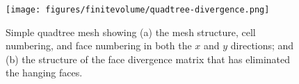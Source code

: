 \begin{figure}[ht]
    \centering
    \texttt{[image: figures/finitevolume/quadtree-divergence.png]}
    \caption{Simple quadtree mesh showing (a) the mesh structure, cell numbering, and face numbering in both the $x$ and $y$ directions; and (b) the structure of the face divergence matrix that has eliminated the hanging faces.}
    \label{fig:finitevolume-quadtree-divergence}
\end{figure}
